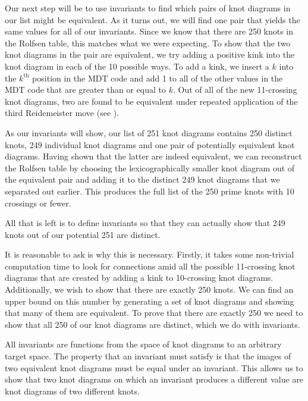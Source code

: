 \begin{paper}

Our next step will be to use invariants to find which pairs of knot diagrams in
our list might be equivalent.
As it turns out, we will find one pair that yields the same values for all of
our invariants.
Since we know that there are 250 knots in the Rolfsen table, this matches what
we were expecting.
To show that the two knot diagrams in the pair are equivalent, we try adding a
positive kink into the knot diagram in each of the 10 possible ways.
To add a kink, we insert a $k$ into the $k^\text{th}$ position in the MDT code
and add 1 to all of the other values in the MDT code that are greater than or
equal to $k$.
Out of all of the new 11-crossing knot diagrams, two are found to be equivalent
under repeated application of the third Reidemeister move (see \figMoves).


As our invariants will show, our list of 251 knot diagrams contains 250 distinct
knots, 249 individual knot diagrams and one pair of potentially equivalent knot
diagrams.
Having shown that the latter are indeed equivalent, we can reconstruct the
Rolfsen table by choosing the lexicographically smaller knot diagram out of the
equivalent pair and adding it to the distinct 249 knot diagrams that we
separated out earlier.
This produces the full list of the 250 prime knots with 10 crossings or fewer.

All that is left is to define invariants so that they can actually show that 249
knots out of our potential 251 are distinct.

It is reasonable to ask is why this is necessary.
Firstly, it takes some non-trivial computation time to look for connections amid
all the possible 11-crossing knot diagrams that are created by adding a kink to
10-crossing knot diagrams.
Additionally, we wish to show that there are exactly 250 knots.
We can find an upper bound on this number by generating a set of knot diagrams
and showing that many of them are equivalent.
To prove that there are exactly 250 we need to show that all 250 of our knot
diagrams are distinct, which we do with invariants.


All invariants are functions from the space of knot diagrams to an arbitrary
target space.
The property that an invariant must satisfy is that the images of two equivalent
knot diagrams must be equal under an invariant.
This allows us to show that two knot diagrams on which an invariant produces a
different value are knot diagrams of two different knots.


\end{paper}
